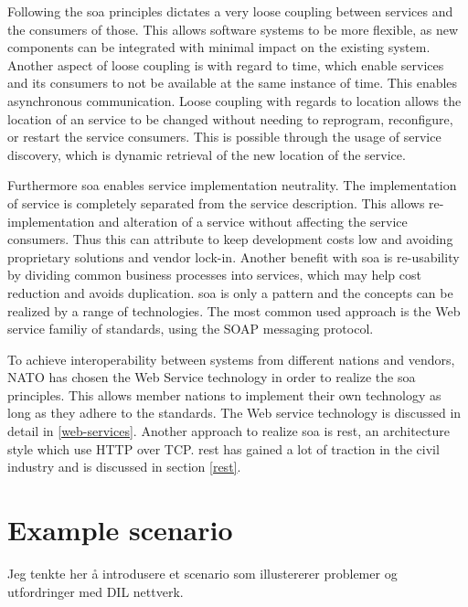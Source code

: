 Following the \gls{soa} principles dictates a very loose coupling between
services and the consumers of those. This allows software systems to be more
flexible, as new components can be integrated with minimal impact on the
existing system. Another aspect of loose coupling is with regard to time, which
enable services and its consumers to not be available at the same instance of
time. This enables asynchronous communication. Loose coupling with regards to
location allows the location of an service to be changed without needing to
reprogram, reconfigure, or restart the service consumers. This is possible
through the usage of service discovery, which is dynamic retrieval of the
new location of the service.

Furthermore \gls{soa} enables service implementation neutrality. The
implementation of service is completely separated from the service
description. This allows re-implementation and alteration of a service without
affecting the service consumers. Thus this can attribute to keep development
costs low and avoiding proprietary solutions and vendor lock-in. Another
benefit with \gls{soa} is re-usability by dividing common business processes
into services, which may help cost reduction and avoids duplication. \gls{soa}
is only a pattern and the concepts can be realized by a range of technologies.
The most common used approach is the Web service familiy of standards, using
the SOAP messaging protocol.

To achieve interoperability between systems from different nations and
vendors, NATO has chosen the Web Service technology in order to realize the
\gls{soa}  principles\cite{soa-baseline}. This allows member nations to
implement their own technology as long as they adhere to the standards. The
Web service technology is discussed in detail in \cref{web-services}. Another
approach to realize \gls{soa} is \gls{rest}, an architecture style which use
HTTP over TCP. \gls{rest} has gained a lot of traction in the civil industry
and is discussed in section \cref{rest}.




\section{Example scenario}

Jeg tenkte her å introdusere et scenario som illustererer problemer og utfordringer
med DIL nettverk.

